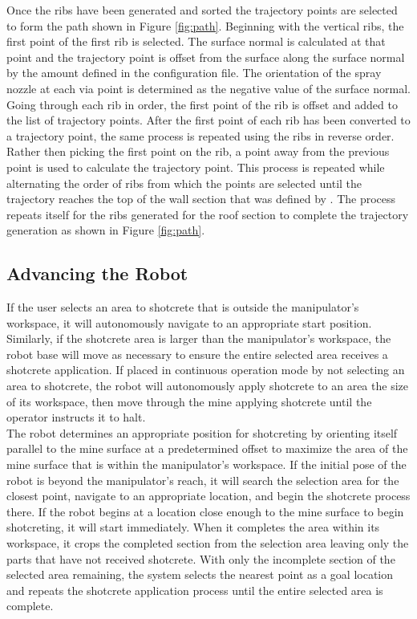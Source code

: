 Once the ribs have been generated and sorted the trajectory points are selected to form the path shown in Figure \ref{fig:path}. Beginning with the vertical ribs, the first point of the first rib is selected. The surface normal is calculated at that point and the trajectory point is offset from the surface along the surface normal by the  amount defined in the configuration file. The orientation of the spray nozzle at each via point is determined as the negative value of the surface normal. Going through each rib in order, the first point of the rib is offset and added to the list of trajectory points. After the first point of each rib has been converted to a trajectory point, the same process is repeated using the ribs in reverse order. Rather then picking the first point on the rib, a point  away from the previous point is used to calculate the trajectory point. This process is repeated while alternating the order of ribs from which the points are selected until the trajectory reaches the top of the wall section that was defined by . The process repeats itself for the ribs generated for the roof section to complete the trajectory generation as shown in Figure \ref{fig:path}.\\

\subsection{Advancing the Robot}

If the user selects an area to shotcrete that is outside the manipulator's workspace, it will autonomously navigate to an appropriate start position. Similarly, if the shotcrete area is larger than the manipulator's workspace, the robot base will move as necessary to ensure the entire selected area receives a shotcrete application. If placed in continuous operation mode by not selecting an area to shotcrete, the robot will autonomously apply shotcrete to an area the size of its workspace, then move through the mine applying shotcrete until the operator instructs it to halt.\\

The robot determines an appropriate position for shotcreting by orienting itself parallel to the mine surface at a predetermined offset to maximize the area of the mine surface that is within the manipulator's workspace. If the initial pose of the robot is beyond the manipulator's reach, it will search the selection area for the closest point, navigate to an appropriate location, and begin the shotcrete process there. If the robot begins at a location close enough to the mine surface to begin shotcreting, it will start immediately. When it completes the area within its workspace, it crops the completed section from the selection area leaving only the parts that have not received shotcrete. With only the incomplete section of the selected area remaining, the system selects the nearest point as a goal location and repeats the shotcrete application process until the entire selected area is complete.\\

